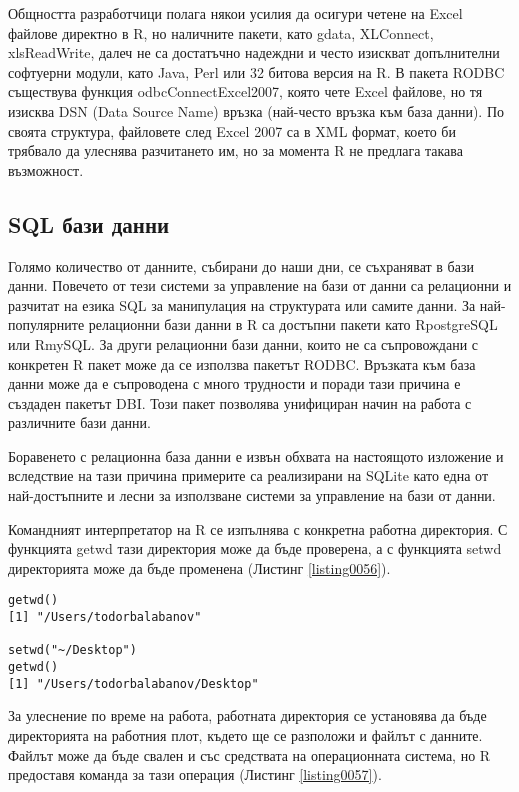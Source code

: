Общността разработчици полага някои усилия да осигури четене на Excel файлове директно в R, но наличните пакети, като gdata, XLConnect, xlsReadWrite, далеч не са достатъчно надеждни и често изискват допълнителни софтуерни модули, като Java, Perl или 32 битова версия на R. В пакета RODBC съществува функция odbcConnectExcel2007, която чете Excel файлове, но тя изисква DSN (Data Source Name) връзка (най-често връзка към база данни). По своята структура, файловете след Excel 2007 са в XML формат, което би трябвало да улеснява разчитането им, но за момента R не предлага такава възможност.

\subsection{SQL бази данни}

Голямо количество от данните, събирани до наши дни, се съхраняват в бази данни. Повечето от тези системи за управление на бази от данни са релационни и разчитат на езика SQL \cite{sql} за манипулация на структурата или самите данни. За най-популярните релационни бази данни в R са достъпни пакети като RpostgreSQL или RmySQL. За други релационни бази данни, които не са съпровождани с конкретен R пакет може да се използва пакетът RODBC. Връзката към база данни може да е съпроводена с много трудности и поради тази причина е създаден пакетът DBI. Този пакет позволява унифициран начин на работа с различните бази данни.

Боравенето с релационна база данни е извън обхвата на настоящото изложение и вследствие на тази причина примерите са реализирани на SQLite като една от най-достъпните и лесни за използване системи за управление на бази от данни.

Командният интерпретатор на R се изпълнява с конкретна работна директория. С функцията getwd тази директория може да бъде проверена, а с функцията setwd директорията може да бъде променена (Листинг \ref{listing0056}).

\begin{lstlisting}[caption=Работна директория, label=listing0056]
getwd()
[1] "/Users/todorbalabanov"

setwd("~/Desktop")
getwd()
[1] "/Users/todorbalabanov/Desktop"
\end{lstlisting}

За улеснение по време на работа, работната директория се установява да бъде директорията на работния плот, където ще се разположи и файлът с данните. Файлът може да бъде свален и със средствата на операционната система, но R предоставя команда за тази операция (Листинг \ref{listing0057}).

